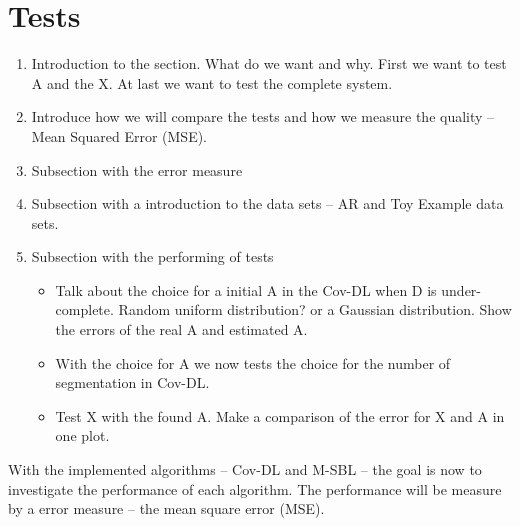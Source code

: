 \section{Tests}
\begin{enumerate}
\item Introduction to the section. What do we want and why. First we want to test A and the X. At last we want to test the complete system.
\item Introduce how we will compare the tests and how we measure the quality -- Mean Squared Error (MSE).
\item Subsection with the error measure
\item Subsection with a introduction to the data sets -- AR and Toy Example data sets.
\item Subsection with the performing of tests
	\begin{itemize}
	\item Talk about the choice for a initial A in the Cov-DL when D is under-complete. Random uniform distribution? or a Gaussian distribution. Show the errors of the real A and estimated A.
	\item With the choice for A we now tests the choice for the number of segmentation in Cov-DL.
	\item Test X with the found A. Make a comparison of the error for X and A in one plot.
	\end{itemize}
\end{enumerate}
With the implemented algorithms -- Cov-DL and M-SBL -- the goal is now to investigate the performance of each algorithm. The performance will be measure by a error measure -- the mean square error (MSE).


